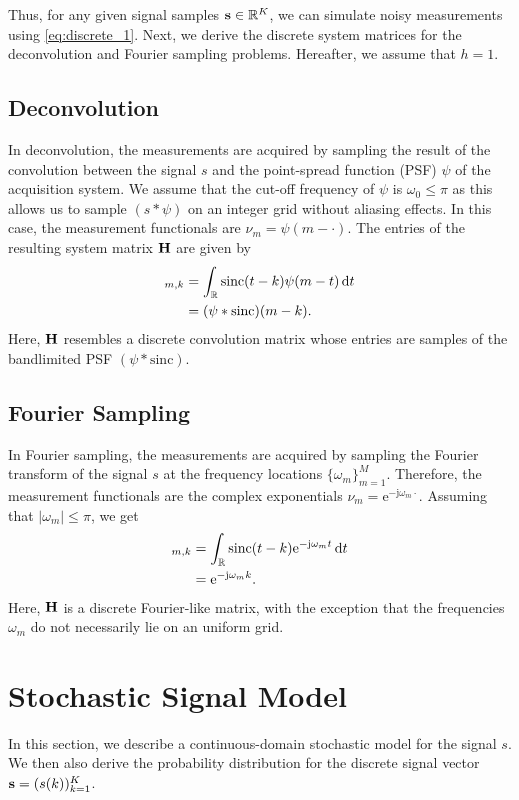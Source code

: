 \documentclass[journal]{IEEEtran}
\begin{document}
Thus, for any given signal samples ${\bf{s}} \in \mathbb{R}^{K}$, we can simulate noisy measurements using \eqref{eq:discrete_1}. Next, we derive the discrete system matrices for the deconvolution and Fourier sampling problems. Hereafter, we assume that $h=1$.

\subsection{Deconvolution}\label{sec:deconv_forward}
In deconvolution, the measurements are acquired by sampling the result of the convolution between the signal $s$ and the point-spread function (PSF) $\psi$ of the acquisition system. We assume that the cut-off frequency of $\psi$ is $\omega_0 \leq \pi$ as this allows us to sample $(s*\psi)$ on an integer grid without aliasing effects. In this case, the measurement functionals are $\nu_m = \psi(m - \cdot)$. The entries of the resulting system matrix ${\bf{H}}$ are given by
\begin{align}
    [\M H]_{m,k} &= \int_{\R} \text{sinc}(t - k) \psi(m - t) \ud t \nonumber \\
                 &= (\psi*\text{sinc})(m-k).
\end{align}
Here, ${\bf{H}}$ resembles a discrete convolution matrix whose entries are samples of the bandlimited PSF $(\psi*\text{sinc})$.

\subsection{Fourier Sampling}\label{sec:fourier_sampling_forward}
In Fourier sampling, the measurements are acquired by sampling the Fourier transform of the signal $s$ at the frequency locations $\{\omega_m\}_{m=1}^{M}$. Therefore, the measurement functionals are the complex exponentials $\nu_m = \mathrm{e}^{-\mathrm{j} \omega_m \cdot}$. Assuming that $|\omega_m| \leq \pi$, we get
\begin{align}
    [\M H]_{m,k} &= \int_{\R} \text{sinc}(t - k) \mathrm{e}^{-\mathrm{j} \omega_m t} \ud t \nonumber \\
                 &= \mathrm{e}^{-\mathrm{j} \omega_m k}.
\end{align}
Here, ${\bf{H}}$ is a discrete Fourier-like matrix, with the exception that the frequencies $\omega_m$ do not necessarily lie on an uniform grid.


\section{Stochastic Signal Model}
In this section, we describe a continuous-domain stochastic model for the signal $s$. We then also derive the probability distribution for the discrete signal vector ${\bf{s}} = (s(k))_{k=1}^{K}$.
\end{document}
